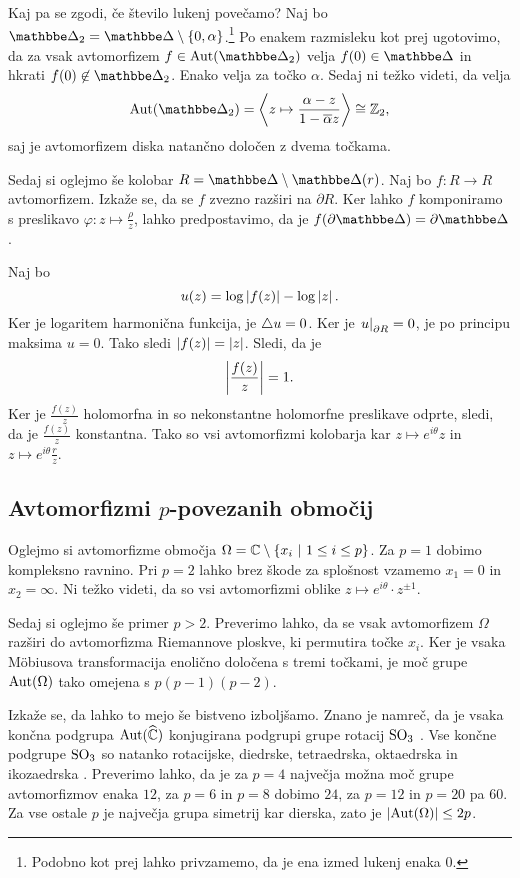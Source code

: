 Kaj pa se zgodi, če število lukenj povečamo? Naj bo
$\dsk_2 = \dsk \setminus \set{0, \alpha}$.\footnote{Podobno kot
prej lahko privzamemo, da je ena izmed lukenj enaka $0$.} Po
enakem razmisleku kot prej ugotovimo, da za vsak avtomorfizem
$f \in \Aut(\dsk_2)$ velja $f(0) \in \dsk$ in hkrati
$f(0) \not \in \dsk_2$. Enako velja za točko $\alpha$. Sedaj ni
težko videti, da velja
\[
\Aut(\dsk_2) =
\skl{z \mapsto \frac{\alpha - z}{1 - \oline{\alpha} z}} \cong
\Z_2,
\]
saj je avtomorfizem diska natančno določen z dvema točkama.

Sedaj si oglejmo še kolobar $R = \dsk \setminus \dsk(r)$. Naj bo
$f \colon R \to R$ avtomorfizem. Izkaže se, da se $f$ zvezno
razširi na $\partial R$. Ker lahko $f$ komponiramo s preslikavo
$\varphi \colon z \mapsto \frac{\rho}{z}$, lahko predpostavimo, da
je $f(\partial \dsk) = \partial \dsk$.

Naj bo
\[
u(z) = \log \left\lvert f(z)\right\rvert - \log \left\lvert z\right\rvert.
\]
Ker je logaritem harmonična funkcija, je $\mathop{}\!\mathbin\bigtriangleup u = 0$. Ker je
$\left. u\right|_{\partial R}^{} = 0$, je po principu maksima $u = 0$. Tako
sledi $\left\lvert f(z)\right\rvert = \left\lvert z\right\rvert$. Sledi, da je
\[
\left\lvert \frac{f(z)}{z}\right\rvert = 1.
\]
Ker je $\frac{f(z)}{z}$ holomorfna in so nekonstantne holomorfne
preslikave odprte, sledi, da je $\frac{f(z)}{z}$ konstantna. Tako
so vsi avtomorfizmi kolobarja kar $z \mapsto e^{i \theta} z$ in
$z \mapsto e^{i \theta} \frac{r}{z}$.



\subsection{Avtomorfizmi \texorpdfstring{$p$}{p}-povezanih območij}

Oglejmo si avtomorfizme območja
$\Omega = \mathbb{C} \setminus \left\{x_i~\middle\vert~1 \leq i \leq p\right\}$. Za $p = 1$
dobimo kompleksno ravnino. Pri $p = 2$ lahko brez škode za
splošnost vzamemo $x_1 = 0$ in $x_2 = \infty$. Ni težko videti, da
so vsi avtomorfizmi oblike
$z \mapsto e^{i \theta} \cdot z^{\pm 1}$.

Sedaj si oglejmo še primer $p > 2$. Preverimo lahko, da se vsak
avtomorfizem $\Omega$ razširi do avtomorfizma Riemannove ploskve,
ki permutira točke $x_i$. Ker je vsaka Möbiusova transformacija
enolično določena s tremi točkami, je moč grupe $\operatorname{Aut}(\Omega)$ tako
omejena s $p (p-1) (p-2)$.

Izkaže se, da lahko to mejo še bistveno izboljšamo. Znano je
namreč, da je vsaka končna podgrupa $\operatorname{Aut}(\widehat{\mathbb{C}})$ konjugirana
podgrupi grupe rotacij $\operatorname{SO}_3$ \cite{Lyndol}. Vse končne podgrupe
$\operatorname{SO}_3$ so natanko rotacijske, diedrske, tetraedrska, oktaedrska in
ikozaedrska \cite{Artin_1991}. Preverimo lahko, da je za $p = 4$
največja možna moč grupe avtomorfizmov enaka $12$, za $p = 6$ in
$p = 8$ dobimo $24$, za $p = 12$ in $p = 20$ pa $60$. Za vse ostale
$p$ je največja grupa simetrij kar dierska, zato je
$\left\lvert \operatorname{Aut}(\Omega)\right\rvert \leq 2p$.




%
